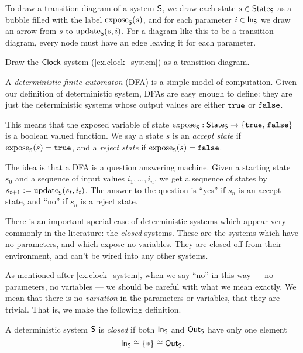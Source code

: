 \documentclass[DynamicalBook]{subfiles}
\begin{document}
\begin{example}
To draw a transition diagram of a system $\mathsf{S}$, we draw each state $s \in
\mathsf{State}_{\mathsf{S}}$ as a bubble filled with the label $\mathrm{expose}_{\mathsf{S}}(s)$, and for each
parameter $i \in \mathsf{In}_{\mathsf{S}}$ we draw an arrow from $s$ to $\mathrm{update}_{\mathsf{S}}(s, i)$. For a
diagram like this to be a transition diagram, every node must have an edge
leaving it for each parameter.
\end{example}

\begin{exercise}
  Draw the $\mathsf{Clock}$ system (\cref{ex.clock_system}) as a transition diagram.
\end{exercise}

\begin{example}
  A \emph{deterministic finite automaton} (DFA) is a simple model of computation.
  Given our definition of deterministic system, DFAs are easy enough to define:
  they are just the deterministic systems whose output values are either
  $\mathtt{true}$ or $\mathtt{false}$. 

  This means that the exposed variable of state $\mathrm{expose}_{\mathsf{S}} : \mathsf{State}_{\mathsf{S}} \to
  \{\mathtt{true},\, \mathtt{false}\}$ is a boolean valued function. We say a
  state $s$ is an \emph{accept state} if $\mathrm{expose}_{\mathsf{S}}(s) = \mathtt{true}$, and a
  \emph{reject state} if $\mathrm{expose}_{\mathsf{S}}(s) = \mathtt{false}$.

  The idea is that a DFA is a question answering machine. Given a starting state
  $s_0$ and a sequence of input values $i_1, \ldots, i_n$, we get a sequence of
  states by $s_{t+1}:= \mathrm{update}_{\mathsf{S}}(s_t, i_t)$. The answer to the question is
  ``yes'' if $s_n$ is an accept state, and ``no'' if $s_n$ is a reject state.

\end{example}

There is an important special case of deterministic systems which appear very
commonly in the literature: the \emph{closed} systems. These are the systems
which have no parameters, and which expose no variables. They are closed off
from their environment, and can't be wired into any other systems.

As mentioned after \cref{ex.clock_system}, when we say ``no'' in this way --- no parameters, no variables --- we should be
careful with what we mean exactly. We mean that there is no \emph{variation} in
the parameters or variables, that they are trivial. That is, we make the
following definition.
\begin{definition}
  A deterministic system $\mathsf{S}$ is \emph{closed} if both $\mathsf{In}_{\mathsf{S}}$ and
  $\mathsf{Out}_{\mathsf{S}}$ have only one element
  \[\mathsf{In}_{\mathsf{S}}\cong\{*\}\cong\mathsf{Out}_{\mathsf{S}}.\]
\end{definition}
\end{document}
